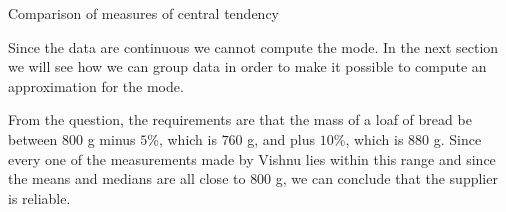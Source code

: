 \begin{wex}{Comparison of measures of central tendency}
{  

  Since the data are continuous we cannot compute the mode. In the next
  section we will see how we can group data in order to make it possible
  to compute an approximation for the mode.


  From the question, the requirements are that the mass of a loaf of
  bread be between $800$ g minus $5$\%, which is $760$ g, and plus
  $10$\%, which is $880$ g. Since every one of the measurements made
  by Vishnu lies within this range and since the means and medians are
  all close to $800$ g, we can conclude that the supplier is reliable.
}
\end{wex}


